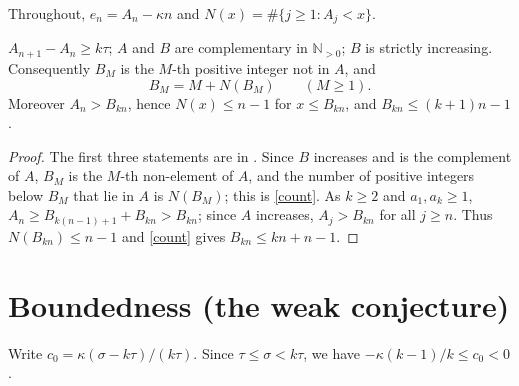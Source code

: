 \documentclass[11pt]{article}
\theoremstyle{remark}\newtheorem{remark}[theorem]{Remark}
\theoremstyle{definition}\newtheorem{definition}[theorem]{Definition}
\newcommand{\N}{\mathbb{N}}
\begin{document}
Throughout, \(e_n=A_n-\kappa n\) and \(N(x)=\#\{j\ge1: A_j<x\}\).

\begin{lemma}\label{basic}
\(A_{n+1}-A_n\ge k\tau\); \(A\) and \(B\) are complementary in \(\N_{>0}\); \(B\) is strictly increasing.
Consequently \(B_M\) is the \(M\)-th positive integer not in \(A\), and
\begin{equation}\label{count}
B_M=M+N(B_M)\qquad(M\ge1).
\end{equation}
Moreover \(A_n>B_{kn}\), hence \(N(x)\le n-1\) for \(x\le B_{kn}\), and \(B_{kn}\le (k+1)n-1\).
\end{lemma}
\begin{proof}
The first three statements are in \cite{fj}. Since \(B\) increases and is the complement of \(A\), \(B_M\) is the \(M\)-th non-element of \(A\), and the number of positive integers below \(B_M\) that lie in \(A\) is \(N(B_M)\); this is \eqref{count}. As \(k\ge2\) and \(a_1,a_k\ge1\), \(A_n\ge B_{k(n-1)+1}+B_{kn}>B_{kn}\); since \(A\) increases, \(A_j>B_{kn}\) for all \(j\ge n\). Thus \(N(B_{kn})\le n-1\) and \eqref{count} gives \(B_{kn}\le kn+n-1\).
\end{proof}

\section{Boundedness (the weak conjecture)}
Write \(c_0=\kappa(\sigma-k\tau)/(k\tau)\). Since \(\tau\le\sigma<k\tau\), we have \(-\kappa(k-1)/k\le c_0<0\).
\end{document}
